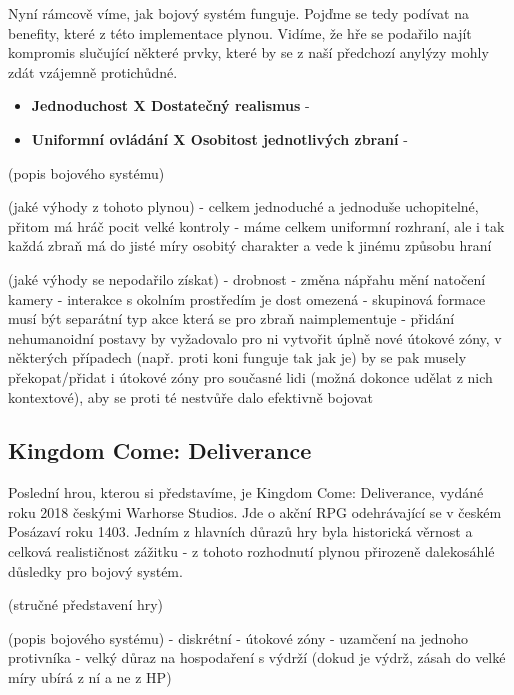 Nyní rámcově víme, jak bojový systém funguje. Pojďme se tedy podívat na benefity, které z této implementace plynou. Vidíme, že hře se podařilo najít kompromis slučující některé prvky, které by se z naší předchozí anylýzy mohly zdát vzájemně protichůdné.
\begin{itemize}
    \item \textbf{Jednoduchost X Dostatečný realismus} - 
    \item \textbf{Uniformní ovládání X Osobitost jednotlivých zbraní} - 
\end{itemize}


\clearpage

(popis bojového systému)

(jaké výhody z tohoto plynou)
- celkem jednoduché a jednoduše uchopitelné, přitom má hráč pocit velké kontroly
- máme celkem uniformní rozhraní, ale i tak každá zbraň má do jisté míry osobitý charakter a vede k jinému způsobu hraní

(jaké výhody se nepodařilo získat)
- drobnost - změna nápřahu mění natočení kamery
- interakce s okolním prostředím je dost omezená
- skupinová formace musí být separátní typ akce která se pro zbraň naimplementuje
- přidání nehumanoidní postavy by vyžadovalo pro ni vytvořit úplně nové útokové zóny, v některých případech (např. proti koni funguje tak jak je) by se pak musely překopat/přidat i útokové zóny pro současné lidi (možná dokonce udělat z nich kontextové), aby se proti té nestvůře dalo efektivně bojovat

\subsection{Kingdom Come: Deliverance}
Poslední hrou, kterou si představíme, je Kingdom Come: Deliverance, vydáné roku 2018 českými Warhorse Studios. Jde o akční \acs{RPG} odehrávající se v českém Posázaví roku 1403. Jedním z hlavních důrazů hry byla historická věrnost a celková realističnost zážitku - z tohoto rozhodnutí plynou přirozeně dalekosáhlé důsledky pro bojový systém.

\clearpage
(stručné představení hry)

(popis bojového systému)
- diskrétní - útokové zóny
- uzamčení na jednoho protivníka
- velký důraz na hospodaření s výdrží (dokud je výdrž, zásah do velké míry ubírá z ní a ne z HP)

